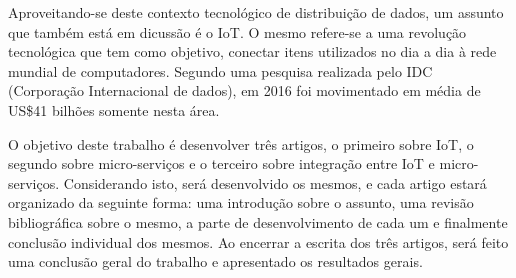 Aproveitando-se deste contexto tecnológico de distribuição de dados, um assunto que também está em dicussão é o IoT. O mesmo refere-se a uma revolução tecnológica que tem como objetivo, conectar itens utilizados no dia a dia à rede mundial de computadores. Segundo uma pesquisa realizada pelo IDC (Corporação Internacional de dados), em 2016 foi movimentado em média de US\$41 bilhões somente nesta área.

O objetivo deste trabalho é desenvolver três artigos, o primeiro sobre IoT, o segundo sobre micro-serviços e o terceiro sobre integração entre IoT e micro-serviços. Considerando isto, será desenvolvido os mesmos, e cada artigo estará organizado da seguinte forma: uma introdução sobre o assunto, uma revisão bibliográfica sobre o mesmo, a parte de desenvolvimento de cada um e finalmente conclusão individual dos mesmos. Ao encerrar a escrita dos três artigos, será feito uma conclusão geral do trabalho e apresentado os resultados gerais.

